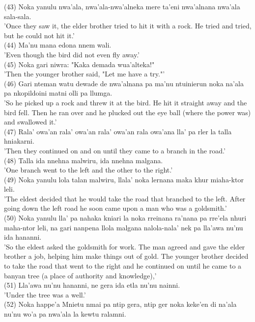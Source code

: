 \documentclass[10pt]{article}
\begin{document}
(43) Noka yanulu nwa'ala, nwa'ala-nwa'alneka mere ta'eni nwa'alnana nwa'ala sala-sala.\\
'Once they saw it, the elder brother tried to hit it with a rock. He tried and tried, but he could not hit it.'\\
(44) Ma'nu mana edona nnem wali.\\
'Even though the bird did not even fly away.'\\
(45) Noka gari niwra: "Kaka demada wua'alteka!"\\
'Then the younger brother said, "Let me have a try."'\\
(46) Gari nteman watu dewade de nwa'alnana pa ma'nu ntuinierun noka na'ala pa nkopildoini matni olli pa llumga.\\
'So he picked up a rock and threw it at the bird. He hit it straight away and the bird fell. Then he ran over and he plucked out the eye ball (where the power was) and swallowed it.'\\
(47) Rala' owa'an rala' owa'an rala' owa'an rala owa'ana lla' pa rler la talla hniakarni.\\
'Then they continued on and on until they came to a branch in the road.'\\
(48) Talla ida nnehna malwiru, ida nnehna malgana.\\
'One branch went to the left and the other to the right.'\\
(49) Noka yanulu lola talan malwiru, llala' noka lernana maka khur miaha-ktor leli.\\
'The eldest decided that he would take the road that branched to the left. After going down the left road he soon came upon a man who was a goldsmith.'\\
(50) Noka yanulu lla' pa nahaka kniari la noka rreinana ra'nana pa rre'ela nhuri maha-ntor leli, na gari nanpena llola malgana nalola-nala' nek pa lla'awa nu'nu ida hananni.\\
'So the eldest asked the goldsmith for work. The man agreed and gave the elder brother a job, helping him make things out of gold. The younger brother decided to take the road that went to the right and he continued on until he came to a banyan tree (a place of authority and knowledge),'\\
(51) Lla'awa nu'nu hananni, ne gera ida etla nu'nu nainni.\\
'Under the tree was a well.'\\
(52) Noka happe'a Mnietu nmai pa ntip gera, ntip ger noka keke'en di na'ala nu'nu wo'a pa nwa'ala la kewtu ralamni.\\
\end{document}
